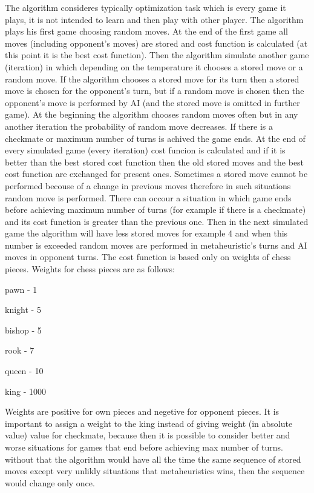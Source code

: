\documentclass[pdftex]{article}
\begin{document}
The algorithm consideres typically optimization task which is every game it plays, it is not intended to learn and then play with other player.
The algorithm plays his first game choosing random moves. At the end of the first game all moves (including opponent's moves) are stored and cost function is calculated (at this point it is the best cost function). Then the algorithm simulate another game (iteration) in which depending on the temperature it chooses a stored move or a random move. If the algorithm chooses a stored move for its turn then a stored move is chosen for the opponent's turn, but if a random move is chosen then the opponent's move is performed by AI (and the stored move is omitted in further game). At the beginning the algorithm chooses random moves often but in any another iteration the probability of random move decreases. If there is a checkmate or maximum number of turns is achived the game ends. At the end of every simulated game (every iteration) cost funcion is calculated and if it is better than the best stored cost function then the old stored moves and the best cost function are exchanged for present ones. Sometimes a stored move cannot be performed becouse of a change in previous moves therefore in such situations random move is performed.
There can occour a situation in which game ends before achieving maximum number of turns (for example if there is a checkmate) and its cost function is greater than the previous one. Then in the next simulated game the algorithm will have less stored moves for example 4 and when this number is exceeded random moves are performed in metaheuristic's turns and AI moves in opponent turns. The cost function is based only on weights of chess pieces. Weights for chess pieces are as follows:

pawn - 1

knight - 5

bishop - 5

rook - 7

queen - 10

king - 1000

Weights are positive for own pieces and negetive for opponent pieces.
It is important to assign a weight to the king instead of giving weight (in absolute value) value for checkmate, because then it is possible to consider better and worse situations for games that end before achieving max number of turns. without that the algorithm would have all the time the same sequence of stored moves except very unlikly situations that metaheuristics wins, then the sequence would change only once.
\end{document}
